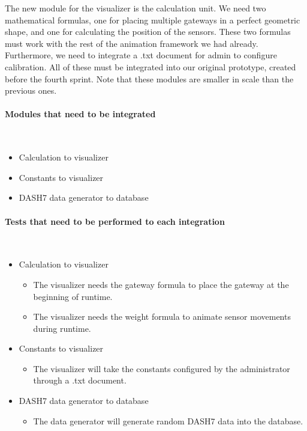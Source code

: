 \documentclass[../document]{subfiles}
\begin{document}
The new module for the visualizer is the calculation unit. We need two mathematical formulas, one for placing multiple gateways in a perfect geometric shape, and one for calculating the position of the sensors. These two formulas must work with the rest of the animation framework we had already. Furthermore, we need to integrate a .txt document for admin to configure calibration. All of these must be integrated into our original prototype, created before the fourth sprint. Note that these modules are smaller in scale than the previous ones.

\paragraph{Modules that need to be integrated} \ \\
\begin{itemize}
	\item
	Calculation to visualizer
	\item
	Constants to visualizer
	\item
	\gls{DASH7} data generator to database
\end{itemize}

\paragraph{Tests that need to be performed to each integration} \ \\
\begin{itemize}
	\item
	Calculation to visualizer
	\begin{itemize}
		\item
		The visualizer needs the gateway formula to place the gateway at the beginning of runtime.
		\item
		The visualizer needs the weight formula to animate sensor movements during runtime.
	\end{itemize}
	\item
	Constants to visualizer
	\begin{itemize}
		\item
		The visualizer will take the constants configured by the administrator through a .txt document.
	\end{itemize}
	\item
	\gls{DASH7} data generator to database
	\begin{itemize}
		\item
		The data generator will generate random \gls{DASH7} data into the database.
	\end{itemize}
\end{itemize}
\end{document}

